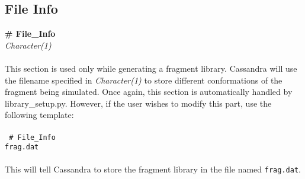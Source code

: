 %
%
\subsection{File Info}\label{sec:File_Info}
{\bf \# File\_Info } \\
{\it Character(1)} \\ \\
%
This section is used only while generating a fragment library. Cassandra will use the filename
specified in {\it Character(1)} to store different conformations of the fragment being simulated. Once again, this
section is automatically handled by library\_setup.py. However, if the user wishes to modify this part, 
use the following template: \\ \\
%
\texttt{
\# File\_Info \\ 
frag.dat \\ \\}
%
This will tell Cassandra to store the fragment library in the file named \texttt{frag.dat}.
%
%
%
